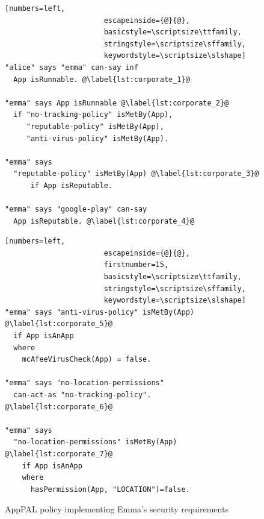 \documentclass[]{llncs}
\begin{document}
\begin{figure}
  \begin{minipage}[t]{0.5\textwidth}
    \begin{lstlisting}[numbers=left,
                       escapeinside={@}{@},
                       basicstyle=\scriptsize\ttfamily,
                       stringstyle=\scriptsize\sffamily,
                       keywordstyle=\scriptsize\slshape]
"alice" says "emma" can-say inf
  App isRunnable. @\label{lst:corporate_1}@

"emma" says App isRunnable @\label{lst:corporate_2}@
  if "no-tracking-policy" isMetBy(App),
     "reputable-policy" isMetBy(App),
     "anti-virus-policy" isMetBy(App).

"emma" says
  "reputable-policy" isMetBy(App) @\label{lst:corporate_3}@
      if App isReputable.

"emma" says "google-play" can-say
  App isReputable. @\label{lst:corporate_4}@
    \end{lstlisting}
  \end{minipage}\begin{minipage}[t]{0.5\textwidth}
    \begin{lstlisting}[numbers=left,
                       escapeinside={@}{@},
                       firstnumber=15,
                       basicstyle=\scriptsize\ttfamily,
                       stringstyle=\scriptsize\sffamily,
                       keywordstyle=\scriptsize\slshape]
"emma" says "anti-virus-policy" isMetBy(App) @\label{lst:corporate_5}@
  if App isAnApp
  where
    mcAfeeVirusCheck(App) = false.

"emma" says "no-location-permissions"
  can-act-as "no-tracking-policy". @\label{lst:corporate_6}@

"emma" says
  "no-location-permissions" isMetBy(App) @\label{lst:corporate_7}@
    if App isAnApp
    where
      hasPermission(App, "LOCATION")=false.
\end{lstlisting}
\end{minipage}
\caption{AppPAL policy implementing Emma's security requirements}
\label{lst:corporate}
\end{figure}
\end{document}
